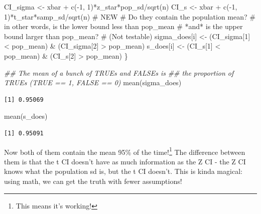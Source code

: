 \documentclass[
  letterpaper,
  DIV=11,
  numbers=noendperiod,
  oneside]{scrreprt}
\newenvironment{Shaded}{\begin{snugshade}}{\end{snugshade}}
\newcommand{\CommentTok}[1]{\textcolor[rgb]{0.37,0.37,0.37}{#1}}
\newcommand{\DecValTok}[1]{\textcolor[rgb]{0.68,0.00,0.00}{#1}}
\newcommand{\DocumentationTok}[1]{\textcolor[rgb]{0.37,0.37,0.37}{\textit{#1}}}
\newcommand{\FunctionTok}[1]{\textcolor[rgb]{0.28,0.35,0.67}{#1}}
\newcommand{\NormalTok}[1]{\textcolor[rgb]{0.00,0.23,0.31}{#1}}
\newcommand{\OtherTok}[1]{\textcolor[rgb]{0.00,0.23,0.31}{#1}}
\newcommand{\SpecialCharTok}[1]{\textcolor[rgb]{0.37,0.37,0.37}{#1}}
\begin{document}
\begin{Shaded}
\begin{Highlighting}[]
\NormalTok{    CI\_sigma }\OtherTok{\textless{}{-}}\NormalTok{ xbar }\SpecialCharTok{+} \FunctionTok{c}\NormalTok{(}\SpecialCharTok{{-}}\DecValTok{1}\NormalTok{, }\DecValTok{1}\NormalTok{)}\SpecialCharTok{*}\NormalTok{z\_star}\SpecialCharTok{*}\NormalTok{pop\_sd}\SpecialCharTok{/}\FunctionTok{sqrt}\NormalTok{(n)}
\NormalTok{    CI\_s }\OtherTok{\textless{}{-}}\NormalTok{ xbar }\SpecialCharTok{+} \FunctionTok{c}\NormalTok{(}\SpecialCharTok{{-}}\DecValTok{1}\NormalTok{, }\DecValTok{1}\NormalTok{)}\SpecialCharTok{*}\NormalTok{t\_star}\SpecialCharTok{*}\NormalTok{samp\_sd}\SpecialCharTok{/}\FunctionTok{sqrt}\NormalTok{(n) }\CommentTok{\# NEW}
    \CommentTok{\# Do they contain the population mean?}
    \CommentTok{\# in other words, is the lower bound less than pop\_mean}
    \CommentTok{\# *and* is the upper bound larger than pop\_mean?}
    \CommentTok{\# (Not testable)}
\NormalTok{    sigma\_does[i] }\OtherTok{\textless{}{-}}\NormalTok{ (CI\_sigma[}\DecValTok{1}\NormalTok{] }\SpecialCharTok{\textless{}}\NormalTok{ pop\_mean) }\SpecialCharTok{\&}\NormalTok{ (CI\_sigma[}\DecValTok{2}\NormalTok{] }\SpecialCharTok{\textgreater{}}\NormalTok{ pop\_mean)}
\NormalTok{    s\_does[i] }\OtherTok{\textless{}{-}}\NormalTok{ (CI\_s[}\DecValTok{1}\NormalTok{] }\SpecialCharTok{\textless{}}\NormalTok{ pop\_mean) }\SpecialCharTok{\&}\NormalTok{ (CI\_s[}\DecValTok{2}\NormalTok{] }\SpecialCharTok{\textgreater{}}\NormalTok{ pop\_mean)}
\NormalTok{\}}

\DocumentationTok{\#\# The mean of a bunch of TRUEs and FALSEs is}
\DocumentationTok{\#\# the proportion of TRUEs (TRUE == 1, FALSE == 0)}
\FunctionTok{mean}\NormalTok{(sigma\_does)}
\end{Highlighting}
\end{Shaded}

\begin{verbatim}
[1] 0.95069
\end{verbatim}

\begin{Shaded}
\begin{Highlighting}[]
\FunctionTok{mean}\NormalTok{(s\_does)}
\end{Highlighting}
\end{Shaded}

\begin{verbatim}
[1] 0.95091
\end{verbatim}

Now both of them contain the mean 95\% of the time!\footnote{This means
  it's working!} The difference between them is that the t CI doesn't
have as much information as the Z CI - the Z CI knows what the
population sd is, but the t CI doesn't. This is kinda magical: using
math, we can get the truth with fewer assumptions!
\end{document}
